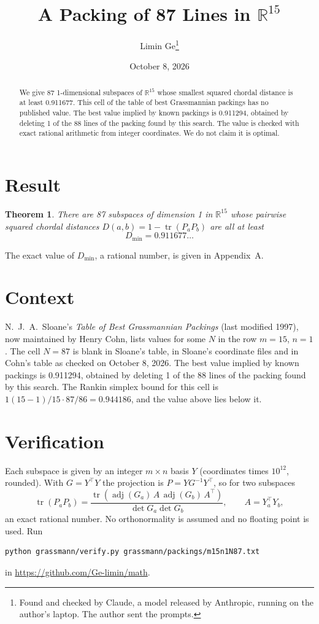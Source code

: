 \documentclass[11pt,a4paper]{article}
\title{A Packing of 87 Lines in $\mathbb{R}^{15}$}
\author{Limin Ge\thanks{Found and checked by Claude, a model released by Anthropic, running on the author's laptop. The author sent the prompts.}}
\date{October 8, 2026}
\newtheorem*{theorem}{Theorem}
\begin{document}
\maketitle
\begin{abstract}
We give 87 1-dimensional subspaces of $\mathbb{R}^{15}$ whose smallest squared chordal distance is at least 0.911677. This cell of the table of best Grassmannian packings has no published value. The best value implied by known packings is 0.911294, obtained by deleting 1 of the 88 lines of the packing found by this search. The value is checked with exact rational arithmetic from integer coordinates. We do not claim it is optimal.
\end{abstract}

\section{Result}
\begin{theorem}
There are 87 subspaces of dimension 1 in $\mathbb{R}^{15}$ whose pairwise squared chordal distances $D(a,b) = 1 - \operatorname{tr}(P_aP_b)$ are all at least
\[ D_{\min} = 0.911677\ldots \]
\end{theorem}
The exact value of $D_{\min}$, a rational number, is given in Appendix~A.


\section{Context}
N.~J.~A.~Sloane's \emph{Table of Best Grassmannian Packings} (last modified 1997), now maintained by Henry Cohn, lists values for some $N$ in the row $m=15$, $n=1$. The cell $N=87$ is blank in Sloane's table, in Sloane's coordinate files and in Cohn's table as checked on October 8, 2026. The best value implied by known packings is 0.911294, obtained by deleting 1 of the 88 lines of the packing found by this search. The Rankin simplex bound for this cell is $1(15-1)/15\cdot 87/86 = 0.944186$, and the value above lies below it.


\section{Verification}
Each subspace is given by an integer $m\times n$ basis $Y$ (coordinates times $10^{12}$, rounded). With $G=Y^\top Y$ the projection is $P=YG^{-1}Y^\top$, so for two subspaces
\[ \operatorname{tr}(P_aP_b)=\frac{\operatorname{tr}(\operatorname{adj}(G_a)\,A\,\operatorname{adj}(G_b)\,A^\top)}{\det G_a\det G_b},\qquad A=Y_a^\top Y_b, \]
an exact rational number. No orthonormality is assumed and no floating point is used. Run
\begin{verbatim}
python grassmann/verify.py grassmann/packings/m15n1N87.txt
\end{verbatim}
in \url{https://github.com/Ge-limin/math}.
\end{document}
